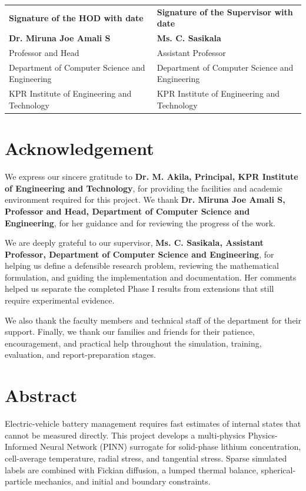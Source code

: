 \documentclass[14pt,a4paper,oneside]{extreport}
\begin{document}
\vspace{3.0cm}
\noindent
\begin{tabularx}{\textwidth}{X X}
\textbf{Signature of the HOD with date} & \textbf{Signature of the Supervisor with date}\\[1.4cm]
\textbf{Dr. Miruna Joe Amali S} & \textbf{Ms. C. Sasikala}\\
Professor and Head & Assistant Professor\\
Department of Computer Science and Engineering & Department of Computer Science and Engineering\\
KPR Institute of Engineering and Technology & KPR Institute of Engineering and Technology
\end{tabularx}

\clearpage
\chapter*{Acknowledgement}
We express our sincere gratitude to \textbf{Dr. M. Akila, Principal, KPR Institute of Engineering and Technology}, for providing the facilities and academic environment required for this project. We thank \textbf{Dr. Miruna Joe Amali S, Professor and Head, Department of Computer Science and Engineering}, for her guidance and for reviewing the progress of the work.

We are deeply grateful to our supervisor, \textbf{Ms. C. Sasikala, Assistant Professor, Department of Computer Science and Engineering}, for helping us define a defensible research problem, reviewing the mathematical formulation, and guiding the implementation and documentation. Her comments helped us separate the completed Phase I results from extensions that still require experimental evidence.

We also thank the faculty members and technical staff of the department for their support. Finally, we thank our families and friends for their patience, encouragement, and practical help throughout the simulation, training, evaluation, and report-preparation stages.

\clearpage
\chapter*{Abstract}
Electric-vehicle battery management requires fast estimates of internal states that cannot be measured directly. This project develops a multi-physics Physics-Informed Neural Network (PINN) surrogate for solid-phase lithium concentration, cell-average temperature, radial stress, and tangential stress. Sparse simulated labels are combined with Fickian diffusion, a lumped thermal balance, spherical-particle mechanics, and initial and boundary constraints.
\end{document}

